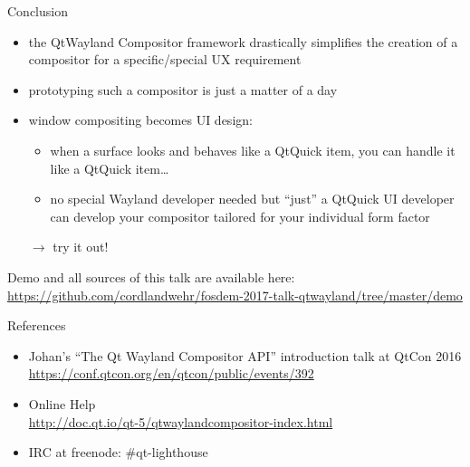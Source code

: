 \documentclass[ucs,9pt]{beamer}
\begin{document}
\begin{frame}
    {Conclusion}

    \begin{itemize}
        \item the QtWayland Compositor framework drastically simplifies the creation of a compositor for a specific/special UX requirement
        \item prototyping such a compositor is just a matter of a day
        \item window compositing becomes UI design:
            \begin{itemize}
                \item when a surface looks and behaves like a QtQuick item, you can handle it like a QtQuick item\dots
                \item no special Wayland developer needed but ``just'' a QtQuick UI developer can develop your compositor tailored for your individual form factor
            \end{itemize}
        \item [$\rightarrow$] try it out!
    \end{itemize}
    \vfill
    Demo and all sources of this talk are available here:\\
    {\small \url{https://github.com/cordlandwehr/fosdem-2017-talk-qtwayland/tree/master/demo}}
\end{frame}

\begin{frame}
    {References}

    \begin{itemize}
        \item Johan's ``The Qt Wayland Compositor API'' introduction talk at QtCon 2016\\
            \url{https://conf.qtcon.org/en/qtcon/public/events/392}
        \item Online Help\\
            \url{http://doc.qt.io/qt-5/qtwaylandcompositor-index.html}
        \item IRC at freenode: \#qt-lighthouse
    \end{itemize}
\end{frame}

\KDElastframe
\end{document}
